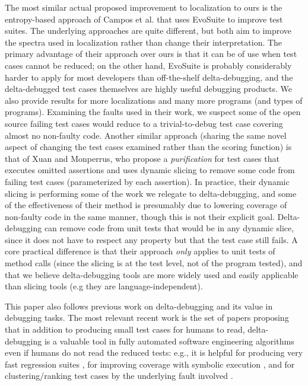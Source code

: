 The most similar actual proposed improvement to localization to ours is the
entropy-based approach of Campos et al. \cite{Entropy} that uses
EvoSuite \cite{FA11} to improve test suites.  The underlying
approaches are quite different, but both aim to improve the spectra
used in localization rather than change their interpretation.  The
primary advantage of their approach over ours is that it can be of use
when test cases cannot be reduced; on the other hand, EvoSuite is
probably considerably harder to apply for most developers than
off-the-shelf delta-debugging, and the delta-debugged test cases
themselves are highly useful debugging products.  We also provide
results for more localizations and many more programs (and types of
programs).  Examining the faults used in their work, we suspect some
of the open source failing test cases would reduce to a
trivial-to-debug test case covering almost no non-faulty code.
Another similar approach (sharing the same novel aspect of changing
the test cases examined rather than the scoring function) is that of
Xuan and Monperrus, who propose a \emph{purification} for test cases
\cite{PureTest} that executes omitted assertions and uses dynamic
slicing \cite{DynamicSlicing} to remove some code from failing test
cases (parameterized by each assertion).  In practice, their dynamic
slicing is performing some of the work we relegate to delta-debugging,
and some of the effectiveness of their method is presumably due to
lowering coverage of non-faulty code in the same manner, though this
is not their explicit goal.  Delta-debugging can remove code from unit
tests that would be in any dynamic slice, since it does not have to
respect any property but that the test case still fails.  A core
practical difference is that their approach \emph{only} applies to
unit tests of method calls (since the slicing is at the test level,
not of the program tested), and that we believe delta-debugging tools
are more widely used and easily applicable than slicing tools (e.g
they are language-independent).

This paper also follows previous work on delta-debugging
\cite{DD,DDISSTA,Yesterday} and its value in debugging tasks.  The
most relevant recent work is the set of papers proposing that in
addition to producing small test cases for humans to read,
delta-debugging is a valuable tool in fully automated software
engineering algorithms even if humans do not read the reduced tests:
e.g., it is helpful for producing very fast regression suites
\cite{icst2014}, for improving coverage with symbolic execution
\cite{issta14}, and for clustering/ranking test cases by the
underlying fault involved \cite{PLDI13}.
